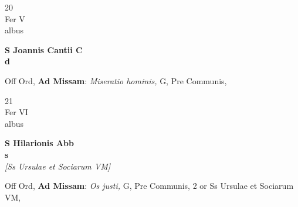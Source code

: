 \documentclass[10pt, openany]{book}
\begin{document}
        \begin{center}
            \begin{minipage}{3.5in}
                \vspace{2em}
                \begin{minipage}{0.5in}
                    {\Huge 20} \\
                    {\normalsize Fer V} \\
                    {\normalsize albus}
                \end{minipage}
                \begin{minipage}{3.0in}
                    \textbf{ \large S Joannis Cantii C \\
                    \textnormal{\normalsize d}} \\ 
                \end{minipage}
                \begin{justify}Off Ord, \textbf{Ad Missam}: \textit{Miseratio hominis,} G, Pre Communis,   
                \end{justify}
            \end{minipage}
        \end{center}
    
        \begin{center}
            \begin{minipage}{3.5in}
                \vspace{2em}
                \begin{minipage}{0.5in}
                    {\Huge 21} \\
                    {\normalsize Fer VI} \\
                    {\normalsize albus}
                \end{minipage}
                \begin{minipage}{3.0in}
                    \textbf{ \large S Hilarionis Abb \\
                    \textnormal{\normalsize s}} \\ \textit{[Ss Ursulae et Sociarum VM]} \\ 
                \end{minipage}
                \begin{justify}Off Ord, \textbf{Ad Missam}: \textit{Os justi,} G, Pre Communis, 2 or Ss Ursulae et Sociarum VM,   
                \end{justify}
            \end{minipage}
        \end{center}
    
\end{document}
